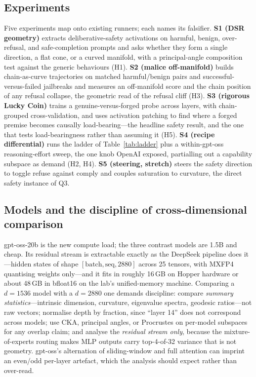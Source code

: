 \documentclass[10pt]{article}
\begin{document}
\subsection{Experiments}

Five experiments map onto existing runners; each names its falsifier.
\textbf{S1 (DSR geometry)} extracts deliberative-safety activations on harmful,
benign, over-refusal, and safe-completion prompts and asks whether they form a
single direction, a flat cone, or a curved manifold, with a principal-angle
composition test against the generic behaviours (H1).
\textbf{S2 (malice off-manifold)} builds chain-as-curve trajectories on matched
harmful/benign pairs and successful-versus-failed jailbreaks and measures an
off-manifold score and the chain position of any refusal collapse, the geometric
read of the refusal cliff \citep{yin2025cliff} (H3).
\textbf{S3 (rigorous Lucky Coin)} trains a genuine-versus-forged probe across
layers, with chain-grouped cross-validation, and uses activation patching to find
where a forged premise becomes causally load-bearing---the headline safety result,
and the one that tests load-bearingness rather than assuming it (H5).
\textbf{S4 (recipe differential)} runs the ladder of Table~\ref{tab:ladder} plus a
within-gpt-oss reasoning-effort sweep, the one knob OpenAI exposed, partialling out
a capability subspace as \citet{ponkshe2025safety} demand (H2, H4).
\textbf{S5 (steering, stretch)} steers the safety direction to toggle refuse against
comply and couples saturation to curvature, the direct safety instance of Q3.

\subsection{Models and the discipline of cross-dimensional comparison}

gpt-oss-20b is the new compute load; the three contrast models are 1.5B and cheap.
Its residual stream is extractable exactly as the DeepSeek pipeline does it---hidden
states of shape $[\text{batch},\text{seq},2880]$ across 25 tensors, with MXFP4
quantising weights only---and it fits in roughly 16\,GB on Hopper hardware or about
48\,GB in bfloat16 on the lab's unified-memory machine. Comparing a $d=1536$ model
with a $d=2880$ one demands discipline: compare \emph{summary statistics}---intrinsic
dimension, curvature, eigenvalue spectra, geodesic ratios---not raw vectors; normalise
depth by fraction, since ``layer 14'' does not correspond across models; use CKA,
principal angles, or Procrustes on per-model subspaces for any overlap claim; and
analyse the \emph{residual stream only}, because the mixture-of-experts routing makes
MLP outputs carry top-4-of-32 variance that is not geometry. gpt-oss's alternation of
sliding-window and full attention can imprint an even/odd per-layer artefact, which
the analysis should expect rather than over-read.
\end{document}
